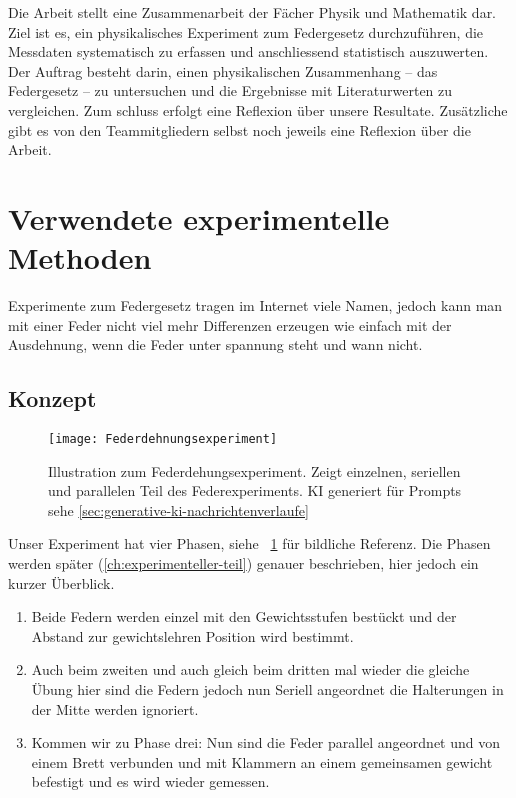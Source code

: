 \documentclass[../main.tex]{subfiles} %
\begin{document}
        Die Arbeit stellt eine Zusammenarbeit der Fächer Physik und Mathematik dar.
        Ziel ist es, ein physikalisches Experiment zum Federgesetz durchzuführen, die Messdaten systematisch zu erfassen und anschliessend statistisch auszuwerten.
        Der Auftrag besteht darin, einen physikalischen Zusammenhang – das Federgesetz – zu untersuchen und die Ergebnisse mit Literaturwerten zu vergleichen.
        Zum schluss erfolgt eine Reflexion über unsere Resultate.
        Zusätzliche gibt es von den Teammitgliedern selbst noch jeweils eine Reflexion über die Arbeit.


    \section{Verwendete experimentelle Methoden}\label{sec:verwendete-experimentelle-methoden}

        Experimente zum Federgesetz tragen im Internet viele Namen, jedoch kann man mit einer Feder nicht viel mehr Differenzen
        erzeugen wie einfach mit der Ausdehnung, wenn die Feder unter spannung steht und wann nicht.

        \subsection{Konzept}\label{subsec:konzept}

            \begin{figure}[h]
                \centering
                \texttt{[image: Federdehnungsexperiment]}
                \caption{Illustration zum Federdehungsexperiment. Zeigt einzelnen, seriellen und parallelen Teil des Federexperiments. KI generiert für Prompts sehe \ref{sec:generative-ki-nachrichtenverlaufe}}
                \label{fig:mesh1}
            \end{figure}

            Unser Experiment hat vier Phasen, siehe ~\ref{fig:mesh1} für bildliche Referenz.
            Die Phasen werden später (\ref{ch:experimenteller-teil}) genauer beschrieben, hier jedoch ein kurzer Überblick.
            \begin{enumerate}
                \item Beide Federn werden einzel mit den Gewichtsstufen bestückt und der Abstand zur gewichtslehren Position wird bestimmt.
                \item Auch beim zweiten und auch gleich beim dritten mal wieder die gleiche Übung hier sind die Federn jedoch nun Seriell angeordnet die Halterungen in der Mitte werden ignoriert.
                \item Kommen wir zu Phase drei: Nun sind die Feder parallel angeordnet und von einem Brett verbunden und mit Klammern an einem gemeinsamen gewicht befestigt und es wird wieder gemessen.
            \end{enumerate}
\end{document}
